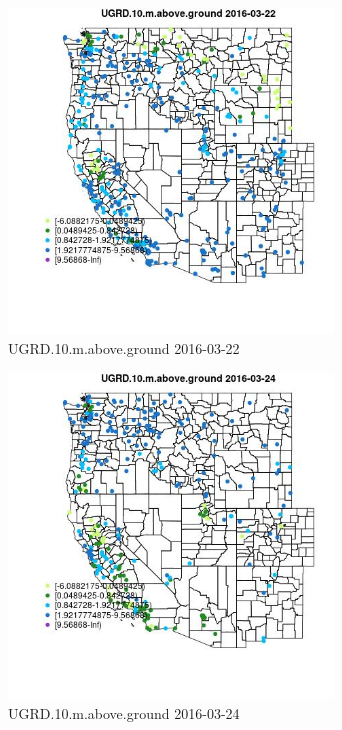 \begin{figure} 
\centering  
\includegraphics[width=0.77\textwidth]{Code_Outputs/Report_ML_input_PM25_Step4_part_e_de_duplicated_aveswNAs_MapObsUGRD10maboveground2016-03-22.jpg} 
\caption{\label{fig:Report_ML_input_PM25_Step4_part_e_de_duplicated_aveswNAsMapObsUGRD10maboveground2016-03-22}UGRD.10.m.above.ground 2016-03-22} 
\end{figure} 
 

\begin{figure} 
\centering  
\includegraphics[width=0.77\textwidth]{Code_Outputs/Report_ML_input_PM25_Step4_part_e_de_duplicated_aveswNAs_MapObsUGRD10maboveground2016-03-24.jpg} 
\caption{\label{fig:Report_ML_input_PM25_Step4_part_e_de_duplicated_aveswNAsMapObsUGRD10maboveground2016-03-24}UGRD.10.m.above.ground 2016-03-24} 
\end{figure} 
 

